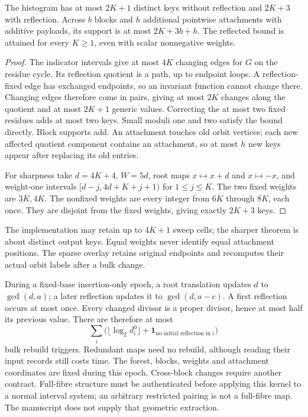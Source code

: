 \begin{proposition}
The histogram has at most $2K+1$ distinct keys without reflection and
$2K+3$ with reflection. Across $b$ blocks and $h$ additional pointwise
attachments with additive payloads, its support is at most $2K+3b+h$.
The reflected bound is attained for every $K\ge1$, even with scalar
nonnegative weights.
\end{proposition}
\begin{proof}
The indicator intervals give at most $4K$ changing edges for $G$ on the
residue cycle. Its reflection quotient is a path, up to endpoint loops.
A reflection-fixed edge has exchanged endpoints, so an invariant function
cannot change there. Changing edges therefore come in pairs, giving at most
$2K$ changes along the quotient and at most $2K+1$ generic values. Correcting
the at most two fixed residues adds at most two keys. Small moduli one and
two satisfy the bound directly. Block supports add. An attachment touches
old orbit vertices; each new affected quotient component contains an
attachment, so at most $h$ new keys appear after replacing its old entries.

For sharpness take $d=4K+4$, $W=5d$, root maps $x\mapsto x+d$ and
$x\mapsto-x$, and weight-one intervals
$[d-j,4d+K+j+1)$ for $1\le j\le K$. The two fixed weights are $3K,4K$.
The nonfixed weights are every integer from $6K$ through $8K$, each once.
They are disjoint from the fixed weights, giving exactly $2K+3$ keys.
\end{proof}

The implementation may retain up to $4K+1$ sweep cells; the sharper theorem
is about distinct output keys. Equal weights never identify equal attachment
positions. The sparse overlay retains original endpoints and recomputes their
actual orbit labels after a bulk change.

During a fixed-base insertion-only epoch, a root translation updates
$d$ to $\gcd(d,a)$; a later reflection updates it to $\gcd(d,a-c)$.
A first reflection occurs at most once. Every changed divisor is a proper
divisor, hence at most half its previous value. There are therefore at most
\[
 \sum_i\bigl(\lfloor\log_2d_i^0\rfloor+
                      \mathbf1_{\text{no initial reflection in }i}\bigr)
\]
bulk rebuild triggers. Redundant maps need no rebuild, although reading their
input records still costs time. The forest, blocks, weights and attachment
coordinates are fixed during this epoch. Cross-block changes require another
contract. Full-fibre structure must be authenticated before applying this
kernel to a normal interval system; an arbitrary restricted pairing is not
a full-fibre map. The manuscript does not supply that geometric extraction.

